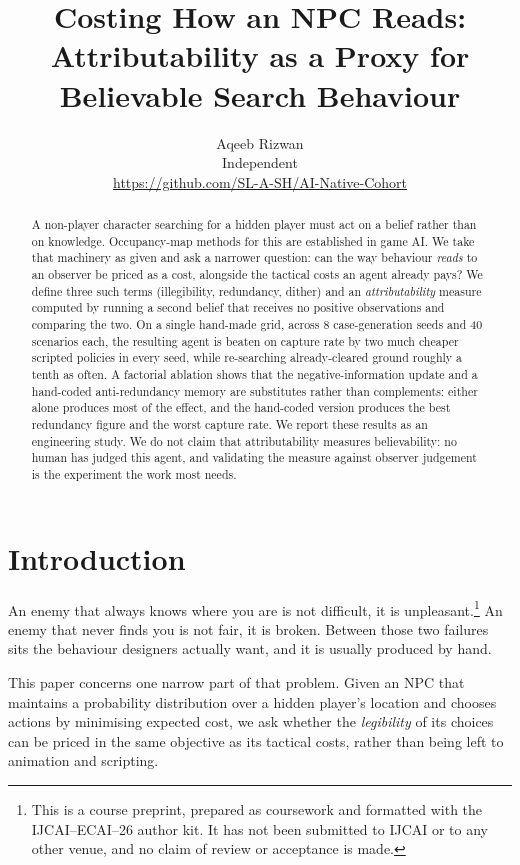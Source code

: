 \documentclass{article}
\title{Costing How an NPC Reads: Attributability as a Proxy for
Believable Search Behaviour}
\author{
Aqeeb Rizwan\\
\affiliations
Independent\\
\emails
\url{https://github.com/SL-A-SH/AI-Native-Cohort}
}
\begin{document}
\maketitle

\begin{abstract}
A non-player character searching for a hidden player must act on a belief rather than on
knowledge. Occupancy-map methods for this are established in game AI. We take that machinery as
given and ask a narrower question: can the way behaviour \emph{reads} to an observer be priced
as a cost, alongside the tactical costs an agent already pays? We define three such terms
(illegibility, redundancy, dither) and an \emph{attributability} measure computed by running a
second belief that receives no positive observations and comparing the two. On a single
hand-made grid, across 8 case-generation seeds and 40 scenarios each, the resulting agent is
beaten on capture rate by two much cheaper scripted policies in every seed, while re-searching
already-cleared ground roughly a tenth as often. A factorial ablation shows that the
negative-information update and a hand-coded anti-redundancy memory are substitutes rather than
complements: either alone produces most of the effect, and the hand-coded version produces the
best redundancy figure and the worst capture rate. We report these results as an engineering
study. We do not claim that attributability measures believability: no human has judged this
agent, and validating the measure against observer judgement is the experiment the work most
needs.
\end{abstract}

\section{Introduction}

An enemy that always knows where you are is not difficult, it is unpleasant.\footnote{This is a
course preprint, prepared as coursework and formatted with the IJCAI--ECAI--26 author kit. It
has not been submitted to IJCAI or to any other venue, and no claim of review or acceptance is
made.} An enemy that never finds you is not fair, it is broken. Between those two failures sits
the behaviour designers actually want, and it is usually produced by hand.

This paper concerns one narrow part of that problem. Given an NPC that maintains a probability
distribution over a hidden player's location and chooses actions by minimising expected cost, we
ask whether the \emph{legibility} of its choices can be priced in the same objective as its
tactical costs, rather than being left to animation and scripting.
\end{document}

